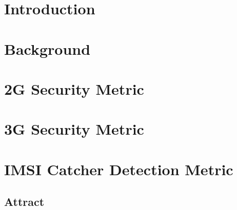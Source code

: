\documentclass[a4paper,11pt,notitlepage,bigheadings,oneside]{scrartcl}
\begin{document}
\newcommand{\TBD}{{\color{srldark}\textbf{TBD}}}
\newcommand{\TODO}[2]{{\color{srldark}\textit{TODO (#1): #2}}}

\newcommand{\criterion}[2]{#2 [#1]}
\newcommand{\crita}[2]{\criterion{A#1}{#2}}
\newcommand{\critk}[2]{\criterion{K#1}{#2}}
\newcommand{\critc}[2]{\criterion{C#1}{#2}}
\newcommand{\critt}[2]{\criterion{T#1}{#2}}
\newcommand{\critr}[2]{\criterion{R#1}{#2}}
\newcommand{\critp}[2]{\criterion{P#1}{#2}}

\maketitle
\pagebreak

\tableofcontents
\pagebreak

\section{Introduction}
\label{sec:introduction}

\section{Background}
\label{sec:background}



\section{2G Security Metric}
\label{sec:2g_security_metric}

\section{3G Security Metric}
\label{sec:3g_security_metric}

\section{IMSI Catcher Detection Metric}
\label{sec:imsi_catcher_detection_metric}

\subsection{Attract}
\end{document}
